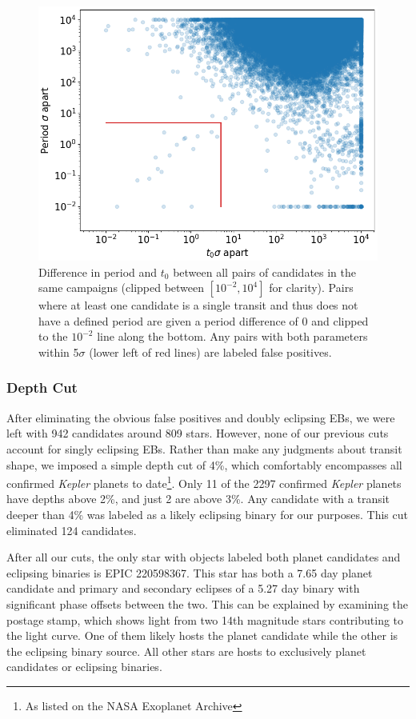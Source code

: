 \documentclass[twocolumn]{aastex62}
\newcommand{\project}[1]{\textsl{#1}}
\newcommand{\withsingles}{942}
\newcommand{\withsinglessys}{809}
\newcommand{\nsingles}{124}
\begin{document}
\begin{figure}[tbp]
\includegraphics[width=\columnwidth]{period_t0_collisions.png}
\caption{Difference in period and $t_0$ between all pairs of
  candidates in the same campaigns (clipped between $[10^{-2}, 10^4]$
  for clarity). Pairs where at least one candidate is a single transit
  and thus does not have a defined period are given a period
  difference of 0 and clipped to the $10^{-2}$ line along the
  bottom. Any pairs with both parameters within 5$\sigma$ (lower left
  of red lines) are labeled false positives. \label{collisions}}
\end{figure}


\subsubsection{Depth Cut}
\label{depthcut}

After eliminating the obvious false positives and doubly eclipsing
EBs, we were left with \withsingles{} candidates around
\withsinglessys{} stars. However, none of our previous cuts account
for singly eclipsing EBs. Rather than make any judgments about transit
shape, we imposed a simple depth cut of 4\%, which comfortably
encompasses all confirmed \project{Kepler} planets to date\footnote{As
  listed on the NASA Exoplanet Archive}. Only 11 of the 2297 confirmed
\project{Kepler} planets have depths above 2\%, and just 2 are above
3\%.  Any candidate with a transit deeper than 4\% was labeled as a
likely eclipsing binary for our purposes. This cut eliminated
\nsingles{} candidates.

After all our cuts, the only star with objects labeled both planet
candidates and eclipsing binaries is EPIC 220598367. This star has
both a 7.65 day planet candidate and primary and secondary eclipses of
a 5.27 day binary with significant phase offsets between the two. This
can be explained by examining the postage stamp, which shows light
from two 14th magnitude stars contributing to the light curve. One of
them likely hosts the planet candidate while the other is the
eclipsing binary source. All other stars are hosts to exclusively
planet candidates or eclipsing binaries.
\end{document}
